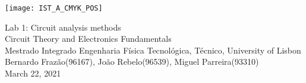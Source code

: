 
\thispagestyle {empty}

\texttt{[image: IST\_A\_CMYK\_POS]}

\begin{center}
%
\vspace{1.0cm}

\vspace{1cm}
{\FontLb Lab 1: Circuit analysis methods} \\ %
\vspace{1cm}
{\FontSn Circuit Theory and Electronics Fundamentals} \\
\vspace{1cm}
{\FontSn Mestrado Integrado Engenharia Física Tecnológica, Técnico, University of Lisbon} \\ %
\vspace{1cm}
{\FontSn Bernardo Frazão(96167), João Rebelo(96539), Miguel Parreira(93310)} \\
\vspace{1cm}
{\FontSn March 22, 2021} \\ %
%
\end{center}

